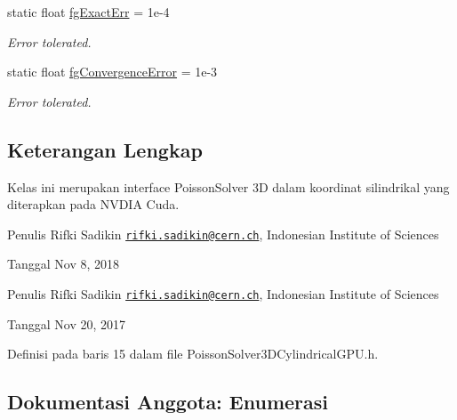 \begin{DoxyCompactItemize}
\hypertarget{classPoissonSolver3DCylindricalGPU_aec3b2f7c092a1f94cc13d1e9c2d9ecaf}{}\label{classPoissonSolver3DCylindricalGPU_aec3b2f7c092a1f94cc13d1e9c2d9ecaf} 
static float \hyperlink{classPoissonSolver3DCylindricalGPU_aec3b2f7c092a1f94cc13d1e9c2d9ecaf}{fg\+Exact\+Err} = 1e-\/4
\begin{DoxyCompactList}\small\item\em Error tolerated. \end{DoxyCompactList}\item 
\hypertarget{classPoissonSolver3DCylindricalGPU_aa4ca52e88fafce30176d4cae5af7f6d9}{}\label{classPoissonSolver3DCylindricalGPU_aa4ca52e88fafce30176d4cae5af7f6d9} 
static float \hyperlink{classPoissonSolver3DCylindricalGPU_aa4ca52e88fafce30176d4cae5af7f6d9}{fg\+Convergence\+Error} = 1e-\/3
\begin{DoxyCompactList}\small\item\em Error tolerated. \end{DoxyCompactList}\end{DoxyCompactItemize}


\subsection{Keterangan Lengkap}
Kelas ini merupakan interface Poisson\+Solver 3D dalam koordinat silindrikal yang diterapkan pada N\+V\+D\+IA Cuda. 

\begin{DoxyAuthor}{Penulis}
Rifki Sadikin \href{mailto:rifki.sadikin@cern.ch}{\tt rifki.\+sadikin@cern.\+ch}, Indonesian Institute of Sciences 
\end{DoxyAuthor}
\begin{DoxyDate}{Tanggal}
Nov 8, 2018
\end{DoxyDate}
\begin{DoxyAuthor}{Penulis}
Rifki Sadikin \href{mailto:rifki.sadikin@cern.ch}{\tt rifki.\+sadikin@cern.\+ch}, Indonesian Institute of Sciences 
\end{DoxyAuthor}
\begin{DoxyDate}{Tanggal}
Nov 20, 2017 
\end{DoxyDate}


Definisi pada baris 15 dalam file Poisson\+Solver3\+D\+Cylindrical\+G\+P\+U.\+h.



\subsection{Dokumentasi Anggota\+: Enumerasi}
\hypertarget{classPoissonSolver3DCylindricalGPU_adb48f4d0173159081f19f859bb3c0ffc}{}\label{classPoissonSolver3DCylindricalGPU_adb48f4d0173159081f19f859bb3c0ffc} 
